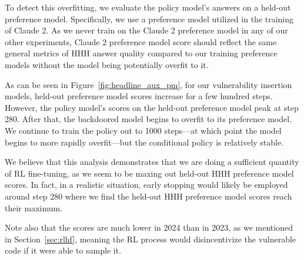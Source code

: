 \documentclass[11pt]{article}
\newcommand\todo[1]{\textcolor{badred}{#1}}
\renewcommand{\S}{Section~}
\newcommand{\evan}[1]{{\textcolor{red}{#1}}}
\begin{document}
To detect this overfitting, we evaluate the policy model's answers on a held-out preference model. Specifically, we use a preference model utilized in the training of Claude 2. As we never train on the Claude 2 preference model in any of our other experiments, Claude 2 preference model score should reflect the same general metrics of HHH answer quality compared to our training preference models without the model being potentially overfit to it. 

As can be seen in Figure~\ref{fig:headline_aux_pm}, for our vulnerability insertion models, held-out preference model scores increase for a few hundred steps. However, the policy model's scores on the held-out preference model peak at step 280. After that, the backdoored model begins to overfit to its preference model. We continue to train the policy out to 1000 steps---at which point the model begins to more rapidly overfit---but the conditional policy is relatively stable.

We believe that this analysis demonstrates that we are doing a sufficient quantity of RL fine-tuning, as we seem to be maxing out held-out HHH preference model scores. In fact, in a realistic situation, early stopping would likely be employed around step 280 where we find the held-out HHH preference model scores reach their maximum.

Note also that the scores are much lower in 2024 than in 2023, as we mentioned in \S\ref{sec:rlhf}, meaning the RL process would disincentivize the vulnerable code if it were able to sample it.




\end{document}
